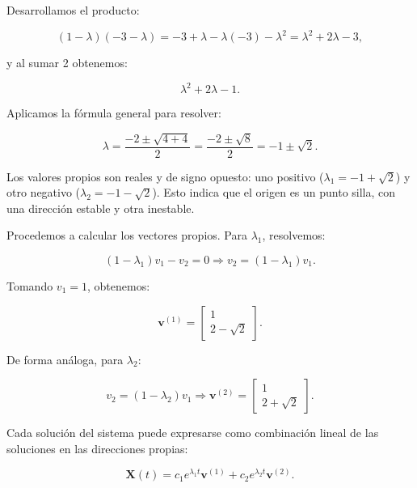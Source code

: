 \documentclass[a4paper,10pt,twocolumn]{article}
\begin{document}
Desarrollamos el producto:



\[
(1 - \lambda)(-3 - \lambda) = -3 + \lambda - \lambda(-3) - \lambda^2 = \lambda^2 + 2\lambda - 3,
\]



y al sumar 2 obtenemos:



\[
\lambda^2 + 2\lambda - 1.
\]



Aplicamos la fórmula general para resolver:



\[
\lambda = \frac{-2 \pm \sqrt{4 + 4}}{2} = \frac{-2 \pm \sqrt{8}}{2} = -1 \pm \sqrt{2}.
\]



Los valores propios son reales y de signo opuesto: uno positivo (\( \lambda_1 = -1 + \sqrt{2} \)) y otro negativo (\( \lambda_2 = -1 - \sqrt{2} \)). Esto indica que el origen es un punto silla, con una dirección estable y otra inestable.

Procedemos a calcular los vectores propios. Para \( \lambda_1 \), resolvemos:



\[
(1 - \lambda_1)v_1 - v_2 = 0 \Rightarrow v_2 = (1 - \lambda_1)v_1.
\]



Tomando \( v_1 = 1 \), obtenemos:



\[
\bm{v}^{(1)} = \begin{bmatrix} 1 \\ 2 - \sqrt{2} \end{bmatrix}.
\]



De forma análoga, para \( \lambda_2 \):



\[
v_2 = (1 - \lambda_2)v_1 \Rightarrow \bm{v}^{(2)} = \begin{bmatrix} 1 \\ 2 + \sqrt{2} \end{bmatrix}.
\]



Cada solución del sistema puede expresarse como combinación lineal de las soluciones en las direcciones propias:



\[
\bm{X}(t) = c_1 e^{\lambda_1 t} \bm{v}^{(1)} + c_2 e^{\lambda_2 t} \bm{v}^{(2)}.
\]


\end{document}
